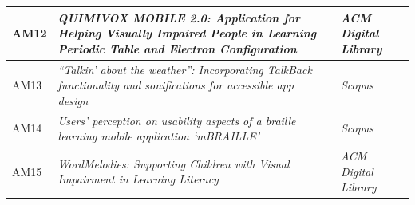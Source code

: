 \begin{quadro}[htb!]
\begin{tabular}{|m{1.0cm} | m{8.1cm} | m{2.6cm} | m{2.5cm}|}
    AM12 & \emph{QUIMIVOX MOBILE 2.0: Application for Helping Visually Impaired People in Learning Periodic Table and Electron Configuration} & \cite{Oliveira2019} & \emph{ACM Digital Library} \\ \hline
    AM13 & \emph{``Talkin' about the weather'': Incorporating TalkBack functionality and sonifications for accessible app design} & \cite{Tomlinson2016377} & \emph{Scopus} \\ \hline
    AM14 & \emph{Users’ perception on usability aspects of a braille learning mobile application ‘mBRAILLE’} & \cite{Nahar2019100} & \emph{Scopus} \\ \hline
    AM15 & \emph{WordMelodies: Supporting Children with Visual Impairment in Learning Literacy} & \cite{Mascetti2019} & \emph{ACM Digital Library} \\ \hline
\end{tabular}
\end{quadro}